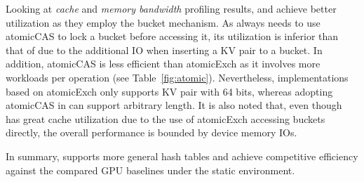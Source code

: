Looking at \emph{cache} and \emph{memory bandwidth} profiling results, \megakv and \voter achieve better utilization as they employ the bucket mechanism.
As \voter always needs to use atomicCAS to lock a bucket before accessing it, its utilization is inferior than that of \megakv due to the additional IO when inserting a KV pair to a bucket. In addition, atomicCAS is less efficient than atomicExch as it involves more workloads per operation (see Table~\ref{fig:atomic}). Nevertheless, implementations based on atomicExch only supports KV pair with 64 bits, whereas adopting atomicCAS in \voter can support arbitrary length. 
It is also noted that, even though \megakv has great cache utilization due to the use of atomicExch accessing buckets directly, the overall performance is bounded by device memory IOs. 

In summary, \voter supports more general hash tables and achieve competitive efficiency against the compared GPU baselines under the static environment. 

